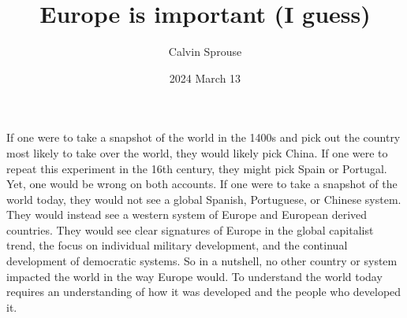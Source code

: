 \documentclass[a4paper, 12pt]{article}
\title{Europe is important (I guess)}
\author{Calvin Sprouse}
\affil{Geography 101 World Regional Geography}
\date{2024 March 13}
\begin{document}
\maketitle

If one were to take a snapshot of the world in the 1400s and pick out the country most likely to take over the world, they would likely pick China. If one were to repeat this experiment in the 16th century, they might pick Spain or Portugal. Yet, one would be wrong on both accounts. If one were to take a snapshot of the world today, they would not see a global Spanish, Portuguese, or Chinese system. They would instead see a western system of Europe and European derived countries. They would see clear signatures of Europe in the global capitalist trend, the focus on individual military development, and the continual development of democratic systems. So in a nutshell, no other country or system impacted the world in the way Europe would. To understand the world today requires an understanding of how it was developed and the people who developed it.
\end{document}
